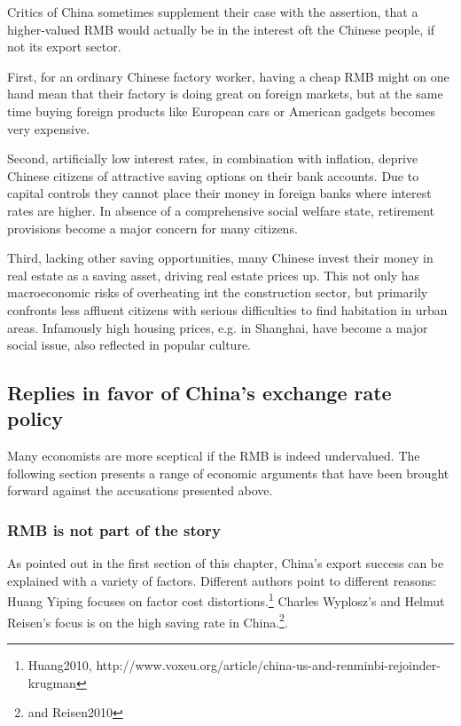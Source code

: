 \documentclass[11pt]{article}
\begin{document}
Critics of China sometimes supplement their case with the assertion, that a higher-valued RMB would actually be in the interest oft the Chinese people, if not its export sector.

First, for an ordinary Chinese factory worker, having a cheap RMB might on one hand mean that their factory 
is doing great on foreign markets, but at the same time buying foreign 
products like European cars or American gadgets becomes very expensive. 

Second, artificially low interest rates, in combination with inflation, deprive Chinese citizens of attractive saving options on their bank accounts. Due to capital controls they cannot place their money in foreign banks where interest rates are higher. In absence of a comprehensive social welfare state, retirement provisions become a major concern for many citizens.

Third, lacking other saving opportunities, many Chinese invest their money in real estate as a saving asset, driving real estate prices up. This not only has macroeconomic risks of overheating int the construction sector, but primarily confronts less affluent citizens with serious difficulties to find habitation in urban areas. Infamously high housing prices, e.g. in Shanghai, have become a major social issue, also reflected in popular culture. %



\subsection{Replies in favor of China's exchange rate policy}

Many economists are more sceptical if the RMB is indeed undervalued. The following section presents a range of economic arguments that have been brought forward against the accusations presented above.

\subsubsection{RMB is not part of the story}

As pointed out in the first section of this chapter, China's export success can be explained with a variety of factors.  Different authors point to different reasons: Huang Yiping focuses on factor cost distortions.\footnote{Huang2010, http://www.voxeu.org/article/china-us-and-renminbi-rejoinder-krugman} Charles Wyplosz's and Helmut Reisen's focus is on the high saving rate in China.\footnote{\cite[pp. 40]{Wyplosz2010} and \cite{p. 65}{Reisen2010}}. 
\end{document}
